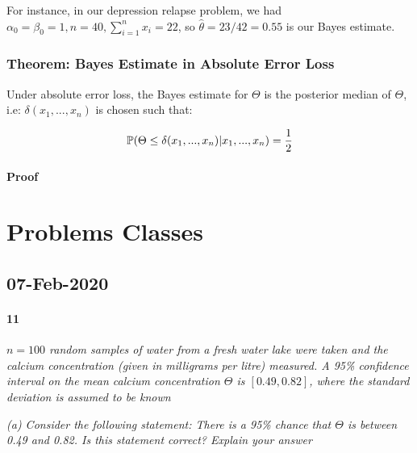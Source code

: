 \documentclass[a4paper]{article}
\begin{document}
                For instance, in our depression relapse problem, we had
                $\alpha_0 = \beta_0 = 1, n = 40, \sum\limits_{i=1}^n x_i = 22$,
                so $\widehat \theta = 23/42 = 0.55$ is our Bayes estimate.

            \subsubsection{Theorem: Bayes Estimate in Absolute Error Loss}
                Under absolute error loss, the Bayes estimate for $\Theta$ is
                the posterior median of $\Theta$, i.e: $\delta(x_1, ..., x_n)$
                is chosen such that:

                \[
                    \mathbb{P}(\Theta \leq \delta(x_1, ..., x_n) | x_1, ..., x_n) =
                    \frac{1}{2}
                \]

                \paragraph{Proof}
                    \begin{fread}
                        [DS12, theorem 4.5.3]
                    \end{fread}

    \newpage
    \section*{Problems Classes}
        \subsection*{07-Feb-2020}
            \paragraph{11}
            \textit{$n = 100$ random samples of water from a fresh water lake
            were taken and the calcium concentration (given in milligrams per
            litre) measured. A 95\% confidence interval on the mean calcium
            concentration $\Theta$ is $[0.49, 0.82]$, where the standard
            deviation is assumed to be known}

            \textit{(a) Consider the following statement: There is a 95\% chance
            that $\Theta$ is between 0.49 and 0.82. Is this statement correct?
            Explain your answer}
\end{document}
